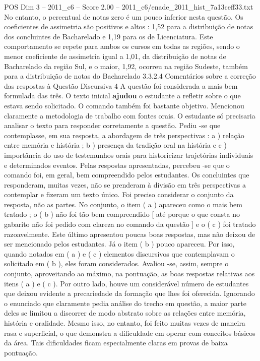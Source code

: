 \begin{textsample}{POS Dim 3 – 2011\_c6 – Score 2.00 – 2011\_c6/enade\_2011\_hist\_7a13ceff33.txt}
No entanto, o percentual de notas zero é um pouco inferior nesta questão.
Os coeficientes de assimetria são positivos e altos : 1,52 para a distribuição de notas dos concluintes de Bacharelado e 1,19 para os de Licenciatura.
Este comportamento se repete para ambos os cursos em todas as regiões, sendo o menor coeficiente de assimetria igual a 1,01, da distribuição de notas de Bacharelado da região Sul, e o maior, 1,92, ocorreu na região Sudeste, também para a distribuição de notas do Bacharelado 3.3.2.4 Comentários sobre a correção das respostas à Questão Discursiva 4 A questão foi considerada a mais bem formulada das três.
O texto inicial \textbf{ajudou} o estudante a refletir sobre o que estava sendo solicitado.
O comando também foi bastante objetivo.
Mencionou claramente a metodologia de trabalho com fontes orais.
O estudante só precisaria analisar o texto para responder corretamente a questão.
Pediu -se que contemplasse, em sua resposta, a abordagem de três perspectivas : a ) relação entre memória e história ; b ) presença da tradição oral na história e c ) importância do uso de testemunhos orais para historicizar trajetórias individuais e determinados eventos.
Pelas respostas apresentadas, percebeu -se que o comando foi, em geral, bem compreendido pelos estudantes.
Os concluintes que responderam, muitas vezes, não se prenderam à divisão em três perspectivas a contemplar e fizeram um texto único.
Foi preciso considerar o conjunto da resposta, não as partes.
No conjunto, o item ( a ) apareceu como o mais bem tratado ; o ( b ) não foi tão bem compreendido [ até porque o que consta no gabarito não foi pedido com clareza no comando da questão ] e o ( c ) foi tratado razoavelmente.
Este último apresentou poucas boas respostas, mas não deixou de ser mencionado pelos estudantes.
Já o item ( b ) pouco apareceu.
Por isso, quando notados em ( a ) e ( c ) elementos discursivos que contemplavam o solicitado em ( b ), eles foram considerados.
Avaliou -se, assim, sempre o conjunto, aproveitando ao máximo, na pontuação, as boas respostas relativas aos itens ( a ) e ( c ).
Por outro lado, houve um considerável número de estudantes que deixou evidente a precariedade da formação que lhes foi oferecida.
Ignorando o enunciado que claramente pedia análise do trecho em questão, a maior parte deles se limitou a discorrer de modo abstrato sobre as relações entre memória, história e oralidade.
Mesmo isso, no entanto, foi feito muitas vezes de maneira rasa e superficial, o que demonstra a dificuldade em operar com conceitos básicos da área.
Tais dificuldades ficam especialmente claras em provas de baixa pontuação.

\end{textsample}
